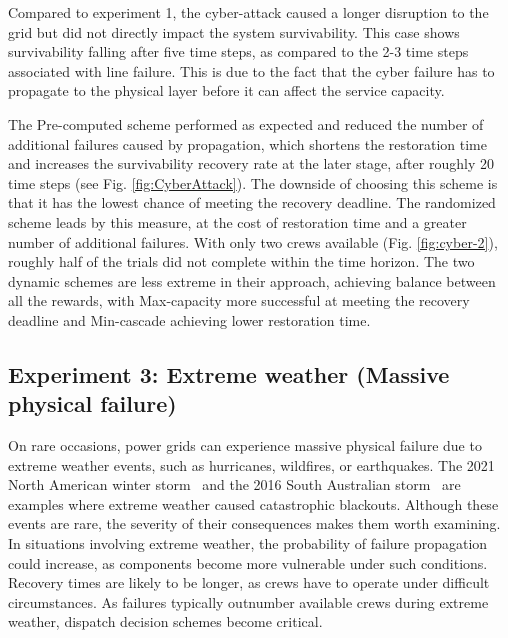 \documentclass[conference]{IEEEtran}
\begin{document}
Compared to experiment 1, the cyber-attack caused a longer disruption to the grid but did not directly impact the system survivability. This case shows survivability falling after five time steps, as compared to the 2-3 time steps associated with line failure. This is due to the fact that the cyber failure has to propagate to the physical layer before it can affect the service capacity. 

The Pre-computed scheme performed as expected and reduced the number of additional failures caused by propagation, which shortens the restoration time and increases the survivability recovery rate at the later stage, after roughly 20 time steps (see Fig.  \ref{fig:CyberAttack}). The downside of choosing this scheme is that it has the lowest chance of meeting the recovery deadline. The randomized scheme leads by this measure, at the cost of restoration time and a greater number of additional failures. With only two crews available (Fig.  \ref{fig:cyber-2}), roughly half of the trials did not complete within the time horizon. The two dynamic schemes are less extreme in their approach, achieving balance between all the rewards, with Max-capacity more successful at meeting the recovery deadline and Min-cascade achieving lower restoration time. 

\subsection{Experiment 3: Extreme weather (Massive physical failure)}
On rare occasions, power grids can experience massive physical failure due to extreme weather events, such as hurricanes, wildfires, or earthquakes. The 2021 North American winter storm~\cite{menati_preliminary_2021} and the 2016 South Australian storm~\cite{jamborsalamati_framework_2018} are  examples where extreme weather caused catastrophic blackouts. Although these events are rare, the severity of their consequences makes them worth examining. In situations involving extreme weather, the probability of failure propagation could increase, as components become more vulnerable under such conditions. Recovery times are likely to be longer, as crews have to operate under difficult circumstances. As failures typically outnumber available crews during extreme weather, dispatch decision schemes become critical.
\end{document}
